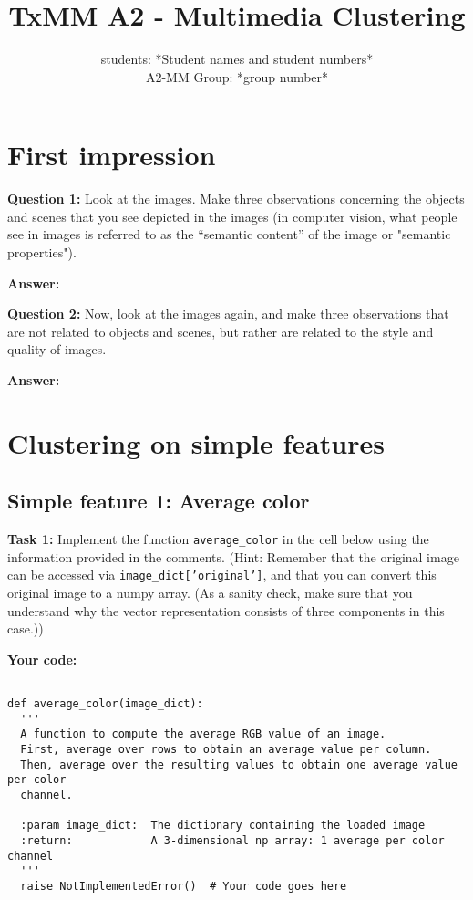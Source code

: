 \documentclass[11pt]{article}
\title{TxMM A2 - Multimedia Clustering}
\author{students: *Student names and student numbers* \\ A2-MM Group: *group number*}
\date{}
\begin{document}
\maketitle

\section{First impression}

\textbf{Question 1:} Look at the images. Make three observations concerning the objects and scenes that you see depicted in the images (in computer vision, what people see in images is referred to as the “semantic content” of the image or "semantic properties").

\textbf{Answer:}


\noindent\textbf{Question 2:} Now, look at the images again, and make three observations that are not related to objects and scenes, but rather are related to the style and quality of images.

\textbf{Answer:}


\section{Clustering on simple features}
\subsection{Simple feature 1: Average color}

\textbf{Task 1:}  Implement the function \texttt{average\_color} in the cell below using the information provided in the comments. (Hint: Remember that the original image can be accessed via \texttt{image\_dict['original']}, and that you can convert this original image to a numpy array. (As a sanity check, make sure that you understand why the vector representation consists of three components in this case.))

\textbf{Your code:}

\begin{lstlisting}

def average_color(image_dict):
  '''
  A function to compute the average RGB value of an image.
  First, average over rows to obtain an average value per column.
  Then, average over the resulting values to obtain one average value per color
  channel.

  :param image_dict:  The dictionary containing the loaded image
  :return:            A 3-dimensional np array: 1 average per color channel
  '''
  raise NotImplementedError()  # Your code goes here
  
\end{lstlisting}
\end{document}
